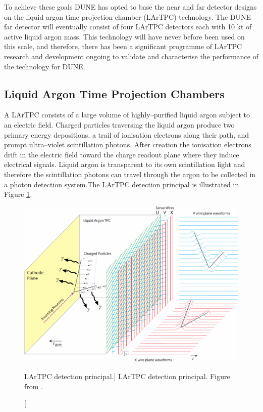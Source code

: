 To achieve these goals DUNE has opted to base the near and far detector designs
on the liquid argon time projection chamber (LArTPC) technology. The DUNE
far detector will eventually consist of four LArTPC detectors each with 10 kt 
of active liquid argon mass. This technology will have never before been used 
on this scale, and therefore, there has been a significant programme of LArTPC 
research and development ongoing to validate and characterise the performance 
of the technology for DUNE. 

\subsection{Liquid Argon Time Projection Chambers}
A LArTPC consists of a large volume of highly--purified liquid argon subject to
an electric field. Charged particles traversing the liquid argon produce two
primary energy depositions, a trail of ionisation electrons along their path,
and prompt ultra--violet scintillation photons. After creation the ionisation
electrons drift in the electric field toward the charge readout plane where they
induce electrical signals. Liquid argon is transparent to its own scintillation
light and therefore the scintillation photons can travel through the argon to be
collected in a photon detection system.The LArTPC detection principal is 
illustrated in Figure \ref{fig:lartpc}. 

\begin{figure}

	\centering

	\includegraphics[width=\textwidth]{figures/LArTPC_Concept.pdf}

	\caption
	[LArTPC detection principal.]
	{LArTPC detection principal. Figure from \cite{Abi:2020loh}.}

	\label{fig:lartpc}

\end{figure}

